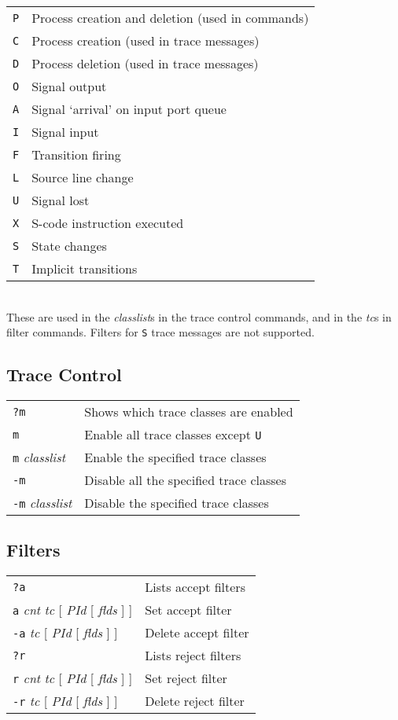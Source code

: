 \begin{tabular}{ll}
{\tt P} & Process creation and deletion (used in commands)\\
{\tt C} & Process creation (used in trace messages)\\
{\tt D} & Process deletion (used in trace messages)\\
{\tt O} & Signal output\\
{\tt A} & Signal `arrival' on input port queue\\
{\tt I} & Signal input\\
{\tt F} & Transition firing\\
{\tt L} & Source line change\\
{\tt U} & Signal lost\\
{\tt X} & S-code instruction executed\\
{\tt S} & State changes\\
{\tt T} & Implicit transitions\\
\end{tabular}\\

These are used in the {\em classlist}s in the trace control commands,
and in the {\em tc}s in filter commands. Filters for {\tt S} trace
messages are not supported.

\subsection{Trace Control}

\begin{tabular}{ll}
{\tt ?m} & Shows which trace classes are enabled\\
{\tt m} & Enable all trace classes except {\tt U}\\
{\tt m} {\em classlist} & Enable the specified trace classes\\
{\tt -m} & Disable all the specified trace classes\\
{\tt -m} {\em classlist} & Disable the specified trace classes\\
\end{tabular}

\subsection{Filters}

\begin{tabular}{ll}
{\tt ?a} & Lists accept filters\\
{\tt a} {\em cnt} {\em tc} [ {\em PId} [ {\em flds} ] ] & Set accept filter\\
{\tt -a} {\em tc} [ {\em PId} [ {\em flds} ] ] & Delete accept filter\\
{\tt ?r} & Lists reject filters\\
{\tt r} {\em cnt} {\em tc} [ {\em PId} [ {\em flds} ] ] & Set reject filter\\
{\tt -r} {\em tc} [ {\em PId} [ {\em flds} ] ] & Delete reject filter\\
\end{tabular}\\

